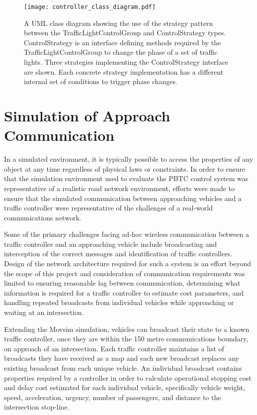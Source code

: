 \begin{figure}[]
\centering
	\texttt{[image: controller\_class\_diagram.pdf]}
	\caption{ A UML class diagram showing the use of the strategy pattern between the TrafficLightControlGroup and ControlStrategy types. ControlStrategy is an interface defining methods required by the TrafficLightControlGroup to change the phase of a set of traffic lights. Three strategies implementing the ControlStrategy interface are shown. Each concrete strategy implementation has a different internal set of conditions to trigger phase changes. }
\label{controllerclassdiagram}
\end{figure}

\section{Simulation of Approach Communication}

In a simulated environment, it is typically possible to access the properties of any object at any time regardless of physical laws or constraints. In order to ensure that the simulation environment used to evaluate the PBTC control system was representative of a realistic road network environment, efforts were made to ensure that the simulated communication between approaching vehicles and a traffic controller were representative of the challenges of a real-world communications network. 

Some of the primary challenges facing ad-hoc wireless communication between a traffic controller and an approaching vehicle include broadcasting and interception of the correct messages and identification of traffic controllers. Design of the network architecture required for such a system is an effort beyond the scope of this project and consideration of communication requirements was limited to ensuring reasonable lag between communication, determining what information is required for a traffic controller to estimate cost parameters, and handling repeated broadcasts from individual vehicles while approaching or waiting at an intersection.

Extending the Movsim simulation, vehicles can broadcast their state to a known traffic controller, once they are within the 150 metre communications boundary, on approach of an intersection. Each traffic controller maintains a list of broadcasts they have received as a map and each new broadcast replaces any existing broadcast from each unique vehicle. An individual broadcast contains properties required by a controller in order to calculate operational stopping cost and delay cost estimated for each individual vehicle, specifically vehicle weight, speed, acceleration, urgency, number of passengers, and distance to the intersection stop-line. 

